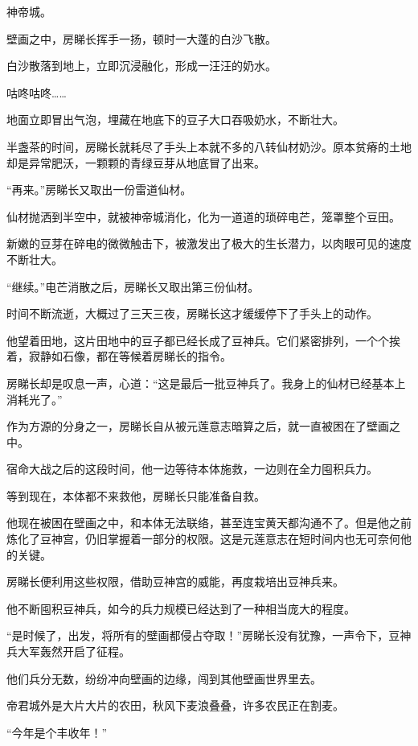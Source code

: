
\begin{this_body}

神帝城。

壁画之中，房睇长挥手一扬，顿时一大蓬的白沙飞散。

白沙散落到地上，立即沉浸融化，形成一汪汪的奶水。

咕咚咕咚……

地面立即冒出气泡，埋藏在地底下的豆子大口吞吸奶水，不断壮大。

半盏茶的时间，房睇长就耗尽了手头上本就不多的八转仙材奶沙。原本贫瘠的土地却是异常肥沃，一颗颗的青绿豆芽从地底冒了出来。

“再来。”房睇长又取出一份雷道仙材。

仙材抛洒到半空中，就被神帝城消化，化为一道道的琐碎电芒，笼罩整个豆田。

新嫩的豆芽在碎电的微微触击下，被激发出了极大的生长潜力，以肉眼可见的速度不断壮大。

“继续。”电芒消散之后，房睇长又取出第三份仙材。

时间不断流逝，大概过了三天三夜，房睇长这才缓缓停下了手头上的动作。

他望着田地，这片田地中的豆子都已经长成了豆神兵。它们紧密排列，一个个挨着，寂静如石像，都在等候着房睇长的指令。

房睇长却是叹息一声，心道：“这是最后一批豆神兵了。我身上的仙材已经基本上消耗光了。”

作为方源的分身之一，房睇长自从被元莲意志暗算之后，就一直被困在了壁画之中。

宿命大战之后的这段时间，他一边等待本体施救，一边则在全力囤积兵力。

等到现在，本体都不来救他，房睇长只能准备自救。

他现在被困在壁画之中，和本体无法联络，甚至连宝黄天都沟通不了。但是他之前炼化了豆神宫，仍旧掌握着一部分的权限。这是元莲意志在短时间内也无可奈何他的关键。

房睇长便利用这些权限，借助豆神宫的威能，再度栽培出豆神兵来。

他不断囤积豆神兵，如今的兵力规模已经达到了一种相当庞大的程度。

“是时候了，出发，将所有的壁画都侵占夺取！”房睇长没有犹豫，一声令下，豆神兵大军轰然开启了征程。

他们兵分无数，纷纷冲向壁画的边缘，闯到其他壁画世界里去。

帝君城外是大片大片的农田，秋风下麦浪叠叠，许多农民正在割麦。

“今年是个丰收年！”


\end{this_body}
